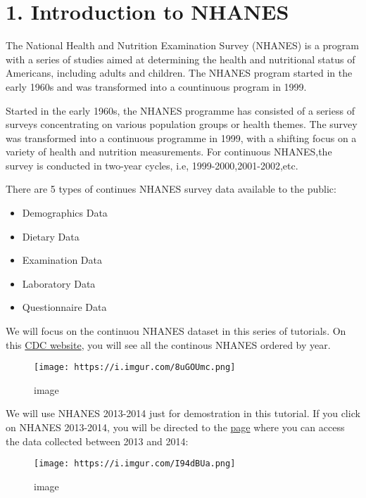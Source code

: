 \documentclass[
]{book}
\begin{document}
\hypertarget{introduction-to-nhanes-1}{%
\section{1. Introduction to NHANES}\label{introduction-to-nhanes-1}}

The National Health and Nutrition Examination Survey (NHANES) is a program with a series of studies aimed at determining the health and nutritional status of Americans, including adults and children. The NHANES program started in the early 1960s and was transformed into a countinuous program in 1999.

Started in the early 1960s, the NHANES programme has consisted of a seriess of surveys concentrating on various population groups or health themes. The survey was transformed into a continuous programme in 1999, with a shifting focus on a variety of health and nutrition measurements. For continuous NHANES,the survey is conducted in two-year cycles, i.e, 1999-2000,2001-2002,etc.

There are 5 types of continues NHANES survey data available to the public:

\begin{itemize}
\item
  Demographics Data
\item
  Dietary Data
\item
  Examination Data
\item
  Laboratory Data
\item
  Questionnaire Data
\end{itemize}

We will focus on the continuou NHANES dataset in this series of tutorials. On this \href{https://wwwn.cdc.gov/nchs/nhanes/}{CDC website}, you will see all the continous NHANES ordered by year.

\begin{figure}
\centering
\texttt{[image: https://i.imgur.com/8uGOUmc.png]}
\caption{image}
\end{figure}

We will use NHANES 2013-2014 just for demostration in this tutorial. If you click on NHANES 2013-2014, you will be directed to the \href{https://wwwn.cdc.gov/nchs/nhanes/continuousnhanes/default.aspx?BeginYear=2013}{page} where you can access the data collected between 2013 and 2014:

\begin{figure}
\centering
\texttt{[image: https://i.imgur.com/I94dBUa.png]}
\caption{image}
\end{figure}
\end{document}
